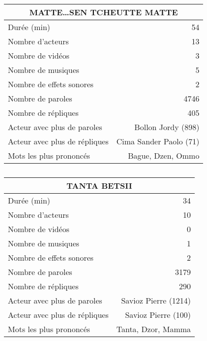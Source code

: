     \begin{table}[]
    \centering
    \caption{}
    \begin{tabular}{lr}\toprule\multicolumn{2}{c}{MATTE\ldots SEN TCHEUTTE MATTE} \\\midrule
\multicolumn{1}{l}{Durée (min)}&54\\
\multicolumn{1}{l}{Nombre d'acteurs}&13\\
\multicolumn{1}{l}{Nombre de vidéos}&3\\
\multicolumn{1}{l}{Nombre de musiques}&5\\
\multicolumn{1}{l}{Nombre de effets sonores}&2\\
\multicolumn{1}{l}{Nombre de paroles}&4746\\
\multicolumn{1}{l}{Nombre de répliques}&405\\
\multicolumn{1}{l}{Acteur avec plus de paroles}&Bollon Jordy (898)\\
\multicolumn{1}{l}{Acteur avec plus de répliques}&Cima Sander Paolo (71)\\
\multicolumn{1}{l}{Mots les plus prononcés}&Bague, Dzen, Ommo\\
    \bottomrule
    \end{tabular}%
    \end{table}
    \begin{table}[]
    \centering
    \caption{}
    \begin{tabular}{lr}\toprule\multicolumn{2}{c}{TANTA BETSII} \\\midrule
\multicolumn{1}{l}{Durée (min)}&34\\
\multicolumn{1}{l}{Nombre d'acteurs}&10\\
\multicolumn{1}{l}{Nombre de vidéos}&0\\
\multicolumn{1}{l}{Nombre de musiques}&1\\
\multicolumn{1}{l}{Nombre de effets sonores}&2\\
\multicolumn{1}{l}{Nombre de paroles}&3179\\
\multicolumn{1}{l}{Nombre de répliques}&290\\
\multicolumn{1}{l}{Acteur avec plus de paroles}&Savioz Pierre (1214)\\
\multicolumn{1}{l}{Acteur avec plus de répliques}&Savioz Pierre (100)\\
\multicolumn{1}{l}{Mots les plus prononcés}&Tanta, Dzor, Mamma\\
    \bottomrule
    \end{tabular}%
    \end{table}
